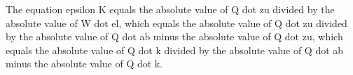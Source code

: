 The equation epsilon K equals the absolute value of Q dot zu divided by the absolute value of W dot el, which equals the absolute value of Q dot zu divided by the absolute value of Q dot ab minus the absolute value of Q dot zu, which equals the absolute value of Q dot k divided by the absolute value of Q dot ab minus the absolute value of Q dot k.